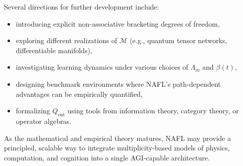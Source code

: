 \documentclass[11pt]{article}
\newcommand{\Mcal}{\mathcal{M}}
\newcommand{\Lm}{\Lambda_m}
\begin{document}
Several directions for further development include:
\begin{itemize}[nosep]
    \item introducing explicit non-associative bracketing degrees of freedom,
    \item exploring different realizations of \(\Mcal\) (e.g., quantum tensor networks, differentiable manifolds),
    \item investigating learning dynamics under various choices of \(\Lm\) and \(\beta(t)\),
    \item designing benchmark environments where NAFL's path-dependent advantages can be empirically quantified,
    \item formalizing \(Q_{\mathrm{ent}}\) using tools from information theory, category theory, or operator algebras.
\end{itemize}

As the mathematical and empirical theory matures, NAFL may provide a principled, scalable way to integrate multiplicity-based models of physics, computation, and cognition into a single AGI-capable architecture.

\nocite{*}
  

\end{document}
